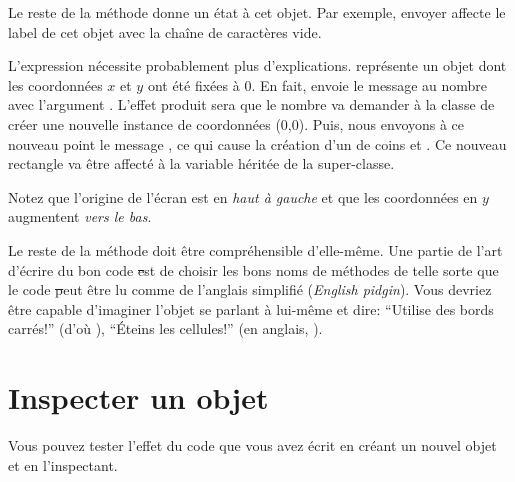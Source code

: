 \documentclass[a4paper,10pt,twoside]{book}
\begin{document}
Le reste de la méthode donne un état à cet objet.
Par exemple, envoyer  affecte le label de cet objet avec la chaîne de caractères vide.

L'expression  nécessite probablement plus d'explications.
 représente un objet  dont les coordonnées $x$ et $y$ ont été fixées à 0.
En fait,  envoie le message %
au nombre  avec l'argument .
L'effet produit sera que le nombre  va demander à la classe  de créer une nouvelle instance de coordonnées (0,0).
Puis, nous envoyons à ce nouveau point le message , ce qui cause la création d'un  de coins  et .
Ce nouveau rectangle va \^etre affecté à la variable  héritée de la super-classe.

Notez que l'origine de l'écran \sq est en \emph{haut à gauche} et que les coordonnées en $y$ augmentent \emph{vers le bas}.

Le reste de la méthode doit \^etre compréhensible d'elle-m\^eme.
Une partie de l'art d'écrire du bon code \st est de choisir les bons
noms de méthodes de telle sorte que le code \st peut \^etre lu comme
de l'anglais simplifié (\emph{English pidgin}).  
Vous devriez \^etre capable d'imaginer l'objet se parlant à lui-m\^eme et
dire:  ``Utilise des bords carrés!'' (d'o\`u ),
``Éteins les cellules!'' (en anglais, ).

\section{Inspecter un objet}

Vous pouvez tester l'effet du code que vous avez écrit en créant un nouvel objet  et en l'inspectant.
\end{document}
